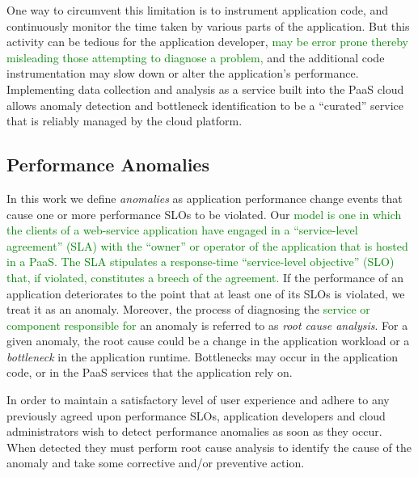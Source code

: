 One way to circumvent this 
limitation is to instrument application code, and continuously monitor the time taken by various
parts of the application. But this activity can be tedious for the application developer, 
\textcolor{green}{may be error prone thereby misleading those attempting to
diagnose a problem,}
and
the additional code instrumentation may slow down or alter the application's
performance. 
Implementing data collection and analysis as a service built into the PaaS cloud allows 
anomaly detection and bottleneck identification to be a ``curated'' service that is 
reliably managed by the cloud platform.

\subsection{Performance Anomalies}
In this work we define \textit{anomalies} as application performance change events that cause
one or more performance SLOs to be violated. Our \textcolor{green}{model is
one in which the clients of a web-service application have engaged in a
``service-level agreement'' (SLA)
with the ``owner'' or operator of the application that is hosted in a PaaS.  The SLA
stipulates a response-time ``service-level objective'' (SLO) that, if violated, constitutes a breech of the
agreement.}
If the performance of an application deteriorates to the
point that at least one of its SLOs is violated, we treat it as an anomaly. Moreover, the process
of diagnosing the \textcolor{green}{service or component responsible for} 
an anomaly is referred to as \textit{root cause analysis}.
For a given anomaly, the root cause could be a change in the application workload or
a \textit{bottleneck} in the application runtime. Bottlenecks may occur in the application code, 
or in the PaaS services that the application rely on.

In order to maintain a satisfactory level of user experience and adhere to any previously
agreed upon performance SLOs, application developers and cloud administrators wish
to detect performance anomalies as soon as they occur. When detected they
must perform root cause analysis to identify the cause of the anomaly and take some
corrective and/or preventive action. 

